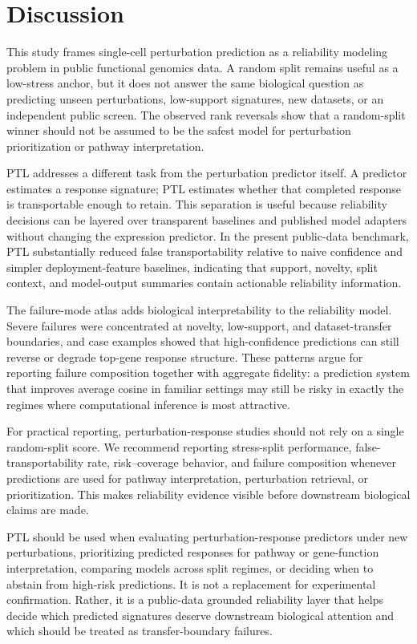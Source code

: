 \section{Discussion}

This study frames single-cell perturbation prediction as a reliability modeling problem in public functional genomics data. A random split remains useful as a low-stress anchor, but it does not answer the same biological question as predicting unseen perturbations, low-support signatures, new datasets, or an independent public screen. The observed rank reversals show that a random-split winner should not be assumed to be the safest model for perturbation prioritization or pathway interpretation.

PTL addresses a different task from the perturbation predictor itself. A predictor estimates a response signature; PTL estimates whether that completed response is transportable enough to retain. This separation is useful because reliability decisions can be layered over transparent baselines and published model adapters without changing the expression predictor. In the present public-data benchmark, PTL substantially reduced false transportability relative to naive confidence and simpler deployment-feature baselines, indicating that support, novelty, split context, and model-output summaries contain actionable reliability information.

The failure-mode atlas adds biological interpretability to the reliability model. Severe failures were concentrated at novelty, low-support, and dataset-transfer boundaries, and case examples showed that high-confidence predictions can still reverse or degrade top-gene response structure. These patterns argue for reporting failure composition together with aggregate fidelity: a prediction system that improves average cosine in familiar settings may still be risky in exactly the regimes where computational inference is most attractive.

For practical reporting, perturbation-response studies should not rely on a single random-split score. We recommend reporting stress-split performance, false-transportability rate, risk--coverage behavior, and failure composition whenever predictions are used for pathway interpretation, perturbation retrieval, or prioritization. This makes reliability evidence visible before downstream biological claims are made.

PTL should be used when evaluating perturbation-response predictors under new perturbations, prioritizing predicted responses for pathway or gene-function interpretation, comparing models across split regimes, or deciding when to abstain from high-risk predictions. It is not a replacement for experimental confirmation. Rather, it is a public-data grounded reliability layer that helps decide which predicted signatures deserve downstream biological attention and which should be treated as transfer-boundary failures.
